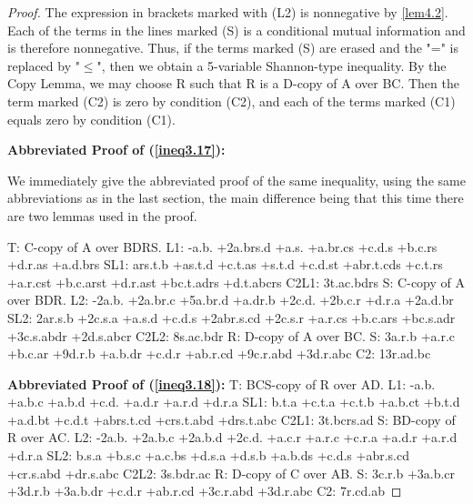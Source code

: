 \documentclass[10pt,journal]{IEEEtran}
\begin{document}
\begin{proof}
The expression in brackets marked with (L2) is nonnegative by \eqref{lem4.2}.
Each of the terms in the lines marked (S) is a conditional mutual
information and is therefore nonnegative.  Thus, if the terms marked (S)
are erased and the "=" is replaced by "$\leq$", then we obtain a 5-variable
Shannon-type inequality.  By the Copy Lemma, we may choose R such
that R is a D-copy of A over BC.  Then the term marked (C2) is zero
by condition (C2), and each of the terms marked (C1) equals zero
by condition (C1).

{\bf Abbreviated Proof of (\ref{ineq3.17}):}

We immediately give the abbreviated proof of the same inequality, using the
same abbreviations as in the last section, the main difference being that this time
there are two lemmas used in the proof.

T: C-copy of A over BDRS.\newline
L1: -a.b. +2a.brs.d +a.s. +a.br.cs +c.d.s +b.c.rs +d.r.as +a.d.brs\newline
SL1: ars.t.b +as.t.d +c.t.as +s.t.d +c.d.st +abr.t.cds +c.t.rs +a.r.cst +b.c.arst +d.r.ast +bc.t.adrs +d.t.abcrs
C2L1: 3t.ac.bdrs\newline
S: C-copy of A over BDR.\newline
L2: -2a.b. +2a.br.c +5a.br.d +a.dr.b +2c.d. +2b.c.r +d.r.a +2a.d.br\newline
SL2: 2ar.s.b +2c.s.a +a.s.d +c.d.s +2abr.s.cd +2c.s.r +a.r.cs +b.c.ars +bc.s.adr +3c.s.abdr +2d.s.abcr\newline
C2L2: 8s.ac.bdr\newline
R: D-copy of A over BC.\newline
S: 3a.r.b +a.r.c +b.c.ar +9d.r.b +a.b.dr +c.d.r +ab.r.cd +9c.r.abd +3d.r.abc\newline
C2: 13r.ad.bc\newline

{\bf Abbreviated Proof of (\ref{ineq3.18}):}
T: BCS-copy of R over AD.\newline
L1: -a.b. +a.b.c +a.b.d +c.d. +a.d.r +a.r.d +d.r.a\newline
SL1: b.t.a +c.t.a +c.t.b +a.b.ct +b.t.d +a.d.bt +c.d.t +abrs.t.cd +crs.t.abd +drs.t.abc
C2L1: 3t.bcrs.ad\newline
S: BD-copy of R over AC.\newline
L2: -2a.b. +2a.b.c +2a.b.d +2c.d. +a.c.r +a.r.c +c.r.a +a.d.r +a.r.d +d.r.a\newline
SL2: b.s.a +b.s.c +a.c.bs +d.s.a +d.s.b +a.b.ds +c.d.s +abr.s.cd +cr.s.abd +dr.s.abc\newline
C2L2: 3s.bdr.ac\newline
R: D-copy of C over AB.\newline
S: 3c.r.b +3a.b.cr +3d.r.b +3a.b.dr +c.d.r +ab.r.cd +3c.r.abd +3d.r.abc\newline
C2: 7r.cd.ab\newline



\end{proof}
\end{document}
